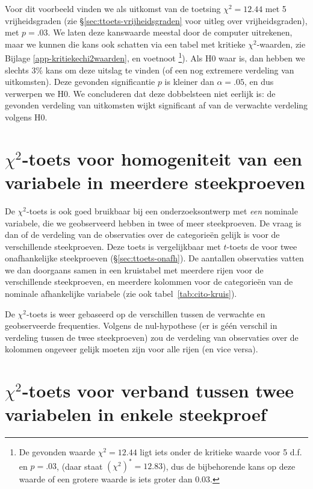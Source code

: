 \documentclass[
]{book}
\begin{document}
Voor dit voorbeeld vinden we als uitkomst van de toetsing \(\chi^2=12.44\)
met 5 vrijheidsgraden (zie
§\ref{sec:ttoets-vrijheidsgraden} voor uitleg over
vrijheidsgraden), met \(p=.03\). We laten deze kanswaarde meestal door de
computer uitrekenen, maar we kunnen die kans ook schatten via een tabel met kritieke \(\chi^2\)-waarden, zie Bijlage \ref{app-kritiekechi2waarden}, en voetnoot \footnote{De gevonden waarde \(\chi^2=12.44\) ligt iets onder de kritieke waarde voor 5 d.f. en \(p=.03\), (daar staat \((\chi^2)^*=12.83\)), dus de bijbehorende kans op deze waarde of een grotere waarde is iets groter dan \(0.03\).}).
Als H0 waar is, dan hebben we slechts 3\% kans om
deze uitslag te vinden (of een nog extremere verdeling van uitkomsten).
Deze gevonden significantie \(p\) is kleiner dan \(\alpha=.05\), en dus
verwerpen we H0. We concluderen dat deze dobbelsteen niet eerlijk is: de
gevonden verdeling van uitkomsten wijkt significant af van de verwachte
verdeling volgens H0.

\section{\texorpdfstring{\(\chi^2\)-toets voor homogeniteit van een variabele in meerdere steekproeven}{\textbackslash chi\^{}2-toets voor homogeniteit van een variabele in meerdere steekproeven}}\label{chi2-toets-voor-homogeniteit-van-een-variabele-in-meerdere-steekproeven}

De \(\chi^2\)-toets is ook goed bruikbaar bij een onderzoeksontwerp met \emph{een} nominale
variabele, die we geobserveerd hebben in twee of meer steekproeven. De
vraag is dan of de verdeling van de observaties over de categorieën
gelijk is voor de verschillende steekproeven. Deze toets is
vergelijkbaar met \(t\)-toets de voor twee onafhankelijke steekproeven
(§\ref{sec:ttoets-onafh}). De aantallen observaties vatten we dan
doorgaans samen in een kruistabel met meerdere rijen voor de
verschillende steekproeven, en meerdere kolommen voor de categorieën van
de nominale afhankelijke variabele (zie ook
tabel~\ref{tab:cito-kruis}).

De \(\chi^2\)-toets is weer gebaseerd op de verschillen tussen de verwachte en
geobserveerde frequenties. Volgens de nul-hypothese (er is géén verschil
in verdeling tussen de twee steekproeven) zou de verdeling van
observaties over de kolommen ongeveer gelijk moeten zijn voor alle rijen
(en vice versa).

\section{\texorpdfstring{\(\chi^2\)-toets voor verband tussen twee variabelen in enkele steekproef}{\textbackslash chi\^{}2-toets voor verband tussen twee variabelen in enkele steekproef}}\label{chi2-toets-voor-verband-tussen-twee-variabelen-in-enkele-steekproef}
\end{document}

